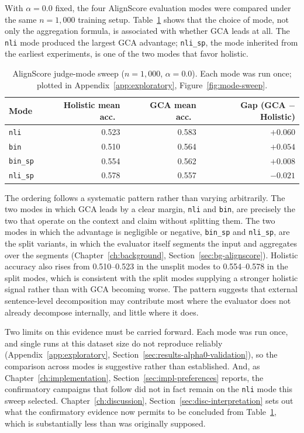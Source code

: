 With $\alpha=0.0$ fixed, the four AlignScore evaluation modes were compared
under the same $n=1{,}000$ training setup. Table~\ref{tab:mode-sweep} shows
that the choice of mode, not only the aggregation formula, is associated with
whether GCA leads at all. The \texttt{nli} mode produced the largest GCA
advantage; \texttt{nli\_sp}, the mode inherited from the earliest experiments,
is one of the two modes that favor holistic.

\begin{table}[htbp]
\centering
\caption[AlignScore evaluator-mode sweep]{AlignScore judge-mode sweep ($n=1{,}000$, $\alpha=0.0$). Each mode was
run once; plotted in Appendix~\ref{app:exploratory},
Figure~\ref{fig:mode-sweep}.}
\label{tab:mode-sweep}
\begin{tabular}{lrrr}
\toprule
Mode & Holistic mean acc.\ & GCA mean acc.\ & Gap (GCA $-$ Holistic) \\
\midrule
\texttt{nli}    & 0.523 & 0.583 & $+0.060$ \\
\texttt{bin}    & 0.510 & 0.564 & $+0.054$ \\
\texttt{bin\_sp} & 0.554 & 0.562 & $+0.008$ \\
\texttt{nli\_sp} & 0.578 & 0.557 & $-0.021$ \\
\bottomrule
\end{tabular}
\end{table}

The ordering follows a systematic pattern rather than varying arbitrarily. The
two modes in which GCA leads by a clear margin, \texttt{nli} and \texttt{bin},
are precisely the two that operate on the context and claim without splitting
them. The two modes in which the advantage is negligible or negative,
\texttt{bin\_sp} and \texttt{nli\_sp}, are the split variants, in which the
evaluator itself segments the input and aggregates over the segments
(Chapter~\ref{ch:background}, Section~\ref{sec:bg-alignscore}). Holistic accuracy
also rises from 0.510--0.523 in the unsplit modes to 0.554--0.578 in the split
modes, which is consistent with the split modes supplying a stronger holistic
signal rather than with GCA becoming worse. The pattern suggests that external
sentence-level decomposition may contribute most where the evaluator does not
already decompose internally, and little where it does.

Two limits on this evidence must be carried forward. Each mode was run once, and
single runs at this dataset size do not reproduce reliably
(Appendix~\ref{app:exploratory}, Section~\ref{sec:results-alpha0-validation}), so
the comparison across modes is suggestive rather than established.
And, as Chapter~\ref{ch:implementation}, Section~\ref{sec:impl-preferences}
reports, the confirmatory campaigns that follow did not in fact remain on the
\texttt{nli} mode this sweep selected. Chapter~\ref{ch:discussion},
Section~\ref{sec:disc-interpretation} sets out what the confirmatory evidence
now permits to be concluded from Table~\ref{tab:mode-sweep}, which is
substantially less than was originally supposed.

